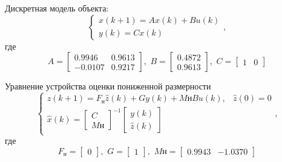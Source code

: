 Дискретная модель объекта:
\begin{equation}
	\begin{cases}
		x(k + 1) = A x(k) + Bu(k)\\
		y(k) = Cx(k)
	\end{cases},
\end{equation}
где
\begin{equation*}
	A = \begin{bmatrix}
0.9946 &	0.9613\\
-0.0107 &	0.9217
	\end{bmatrix}, \, \, 
	B = \begin{bmatrix}
0.4872\\
0.9613
	\end{bmatrix}, \, \, 
	C = \begin{bmatrix}
1 & 0
	\end{bmatrix}
\end{equation*}

Уравнение устройства оценки пониженной размерности
\begin{equation}
	\begin{cases}
		\hat{z}(k+1) = F_\text{н} \hat{z}(k) + Gy(k) + M\text{н}Bu(k), & \hat{z}(0) = 0\\
		\hat{x}(k) = \begin{bmatrix}
			C\\ M\text{н}
		\end{bmatrix}^{-1} \begin{bmatrix}
		y(k)\\ \hat{z}(k)
		\end{bmatrix}
	\end{cases},
\end{equation}
где
\begin{equation*}
	F_\text{н} = \begin{bmatrix}
0
	\end{bmatrix}, \, \, 
	G = \begin{bmatrix}
1
	\end{bmatrix}, \, \, 
	M\text{н} = \begin{bmatrix}
0.9943 &	-1.0370
	\end{bmatrix}
\end{equation*}

